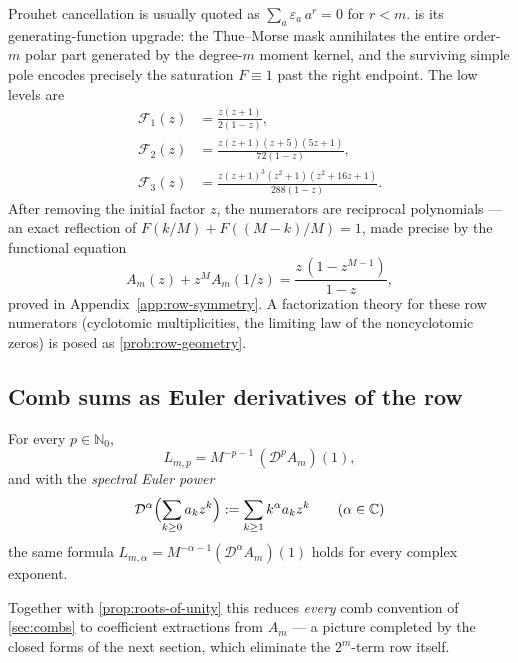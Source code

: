 \documentclass[11pt,oneside]{article}
\numberwithin{equation}{section}
\theoremstyle{definition}
\theoremstyle{remark}
\newcommand{\C}{\mathbb C}
\newcommand{\N}{\mathbb N}
\newcommand{\eps}{\varepsilon}
\newcommand{\Dop}{\mathcal D}
\newcommand{\Frow}{\mathscr F}
\begin{document}
\begin{remark}
Prouhet cancellation is usually quoted as
$\sum_a\eps_a\,a^{r}=0$ for $r<m$.   is its
generating-function upgrade: the Thue--Morse mask annihilates the
entire order-$m$ polar part generated by the degree-$m$ moment kernel,
and the surviving simple pole encodes precisely the saturation
$F\equiv1$ past the right endpoint.  The low levels are
\begin{align}
 \Frow_1(z)&=\frac{z(z+1)}{2(1-z)},
 \label{eq:row-N1}\\
 \Frow_2(z)&=\frac{z(z+1)(z+5)(5z+1)}{72(1-z)},
 \label{eq:row-N2}\\
 \Frow_3(z)&=\frac{z(z+1)^{3}(z^{2}+1)(z^{2}+16z+1)}{288(1-z)}.
 \label{eq:row-N3}
\end{align}
After removing the initial factor $z$, the numerators are reciprocal
polynomials --- an exact reflection of $F(k/M)+F((M-k)/M)=1$, made
precise by the functional equation
\begin{equation}
 A_m(z)+z^{M}A_m(1/z)
 =\frac{z\,(1-z^{M-1})}{1-z},
 \label{eq:AN-reciprocal}
\end{equation}
proved in Appendix~\ref{app:row-symmetry}.  A factorization theory for these
row numerators (cyclotomic multiplicities, the limiting law of the
noncyclotomic zeros) is posed as \cref{prob:row-geometry}.
\end{remark}

\subsection{Comb sums as Euler derivatives of the row}

\begin{corollary}
\label{cor:euler-powers}
For every $p\in\N_0$,
\begin{equation}
 L_{m,p}=M^{-p-1}\,(\Dop^{p}A_m)(1),
 \label{eq:euler-natural}
\end{equation}
and with the \emph{spectral Euler power}
\begin{equation}
 \Dop^{\alpha}\Bigl(\sum_{k\ge0}a_kz^{k}\Bigr)
 :=\sum_{k\ge1}k^{\alpha}a_kz^{k}
 \qquad(\alpha\in\C)
 \label{eq:fractional-Euler}
\end{equation}
the same formula
$L_{m,\alpha}=M^{-\alpha-1}(\Dop^{\alpha}A_m)(1)$ holds for every
complex exponent.
\end{corollary}

Together with \cref{prop:roots-of-unity} this reduces \emph{every}
comb convention of \cref{sec:combs} to coefficient extractions from
$A_m$ --- a picture completed by the closed forms of the next section,
which eliminate the $2^{m}$-term row itself.
\end{document}
